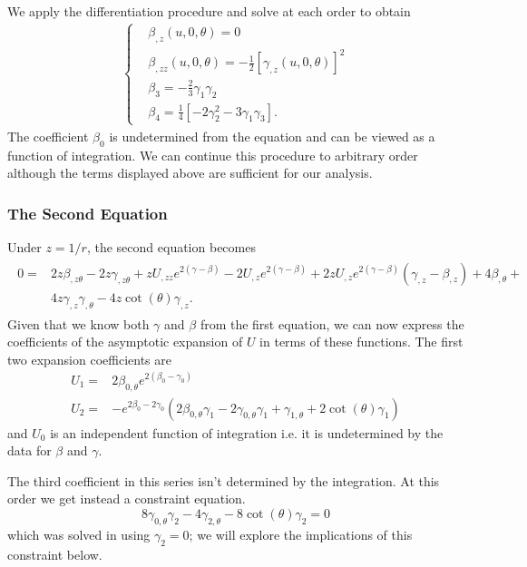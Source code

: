 \documentclass[a4paper,11pt]{article}
\numberwithin{equation}{section}
\begin{document}
We apply the differentiation procedure and solve at each order to obtain 
\begin{align}
\begin{cases}
&\beta_{,z}(u,0, \theta)=0 \\
&\beta_{,zz}(u, 0 ,\theta)=-\frac{1}{2} [\gamma_{,z}(u,0,\theta)]^2\\
& \beta_3=-\frac{2}{3}  \gamma_1 \gamma_2 \\
& \beta_4=\frac{1}{4}\left[ -2 \gamma_2^2-3 \gamma_1 \gamma_3 \right].
\end{cases}
\end{align}
The coefficient $\beta_0$ is undetermined from the equation and can be viewed as a function of integration. We can continue this procedure to arbitrary order although the terms displayed above are sufficient for our analysis.  

\subsubsection{The Second Equation}
\noindent Under $z=1/r$, the second equation becomes
\begin{align}
\begin{split}
0=& 2 z \beta_{,z \theta}-2 z\gamma_{, z\theta}+z U_{,zz}  e^{2(\gamma-\beta)}-2 U_{,z} e^{2(\gamma-\beta)}+ 2 z U_{,z} e^{2(\gamma-\beta)}(\gamma_{,z}-\beta_{,z})+4 \beta_{,\theta}+ \\
&4 z \gamma_{,z}  \gamma_{,\theta}-4 z \cot (\theta ) \gamma_{,z}.  
\end{split}
\end{align}
Given that we know both $\gamma$ and $\beta$ from the first equation, we can now express the coefficients of the asymptotic expansion of $U$ in terms of these functions. The first two expansion coefficients are
\begin{subequations}
\begin{align}
U_1=& 2 \beta_{0, \theta} e^{2( \beta_0- \gamma_0)} \\
U_2=&-e^{2 \beta_0-2 \gamma_0} (2 \beta_{0,\theta} \gamma_1-2 \gamma_{0,\theta}\gamma_1+\gamma_{1,\theta}+2 \cot (\theta ) \gamma_1)
\end{align}
\end{subequations}
and $U_0$ is an independent function of integration i.e. it is undetermined by the data for $\beta$ and $\gamma$. 

The third coefficient in this series isn't determined by the integration. At this order we get instead a constraint equation.
\begin{equation}
8 \gamma_{0,\theta} \gamma_2-4 \gamma_{2,\theta}-8 \cot (\theta ) \gamma_2=0
\end{equation}
which was solved in \cite{Bondi:1962px} using $\gamma_2=0$; we will explore the implications of this constraint below. \par
 
\end{document}
